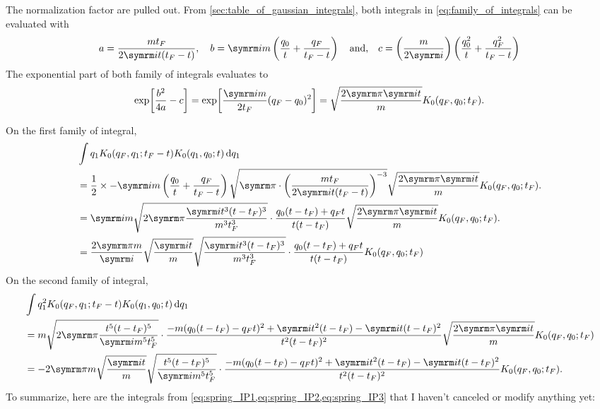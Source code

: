 The normalization factor are pulled out. From \cref{sec:table_of_gaussian_integrals}, both integrals in \cref{eq:family_of_integrals} can be evaluated with
\begin{equation}
    a = \frac{m t_F}{2\im t(t_F - t)}, \quad b = \im m\left(\frac{q_0}{t} + \frac{q_F}{t_F - t}\right) \mathand c = \left(\frac{m}{2\im}\right)\left(\frac{q_0^2}{t} + \frac{q_F^2}{t_F - t}\right)
\end{equation}
The exponential part of both family of integrals evaluates to
\begin{equation}
    \exp[\frac{b^2}{4a} - c] = \exp[\frac{\im m}{2t_F}(q_F - q_0)^2] = \sqrt{\frac{2\cpi\im t}{m}}K_0(q_F, q_0; t_F).
\end{equation}

On the first family of integral,
\begin{align}
    &\int q_1K_0(q_F, q_1; t_F - t)K_0(q_1, q_0; t)\dd{q_1} \\
    &= \frac{1}{2} \times -\im m\left(\frac{q_0}{t} + \frac{q_F}{t_F - t}\right)\sqrt{\cpi \cdot \left(\frac{m t_F}{2\im t(t_F - t)}\right)^{-3}}\sqrt{\frac{2\cpi\im t}{m}}K_0(q_F, q_0; t_F). \\
    &= \im m \sqrt{2\cpi\frac{\im t^3 (t - t_F)^3}{m^3t_F^3}}\cdot\frac{q_0(t - t_F) + q_Ft}{t(t - t_F)}\sqrt{\frac{2\cpi\im t}{m}}K_0(q_F, q_0; t_F). \\
    &= \frac{2\cpi m}{\im}\sqrt{\frac{\im t}{m}}\sqrt{\frac{\im t^3 (t - t_F)^3}{m^3t_F^3}}\cdot\frac{q_0(t - t_F) + q_Ft}{t(t - t_F)}K_0(q_F, q_0; t_F)
\end{align}
On the second family of integral,
\begin{align}
    &\int q_1^2K_0(q_F, q_1; t_F - t)K_0(q_1, q_0; t)\dd{q_1} \\
    &= m\sqrt{2\cpi\frac{t^5(t - t_F)^5}{\im m^5 t_F^5}}\cdot\frac{-m(q_0(t - t_F) - q_Ft)^2 + \im t^2(t - t_F) - \im t(t - t_F)^2}{t^2(t - t_F)^2}\sqrt{\frac{2\cpi\im t}{m}}K_0(q_F, q_0; t_F) \nonumber \\
    &= -2\cpi m \sqrt{\frac{\im t}{m}}\sqrt{\frac{t^5(t - t_F)^5}{\im m^5 t_F^5}}\cdot\frac{-m(q_0(t - t_F) - q_Ft)^2 + \im t^2(t - t_F) - \im t(t - t_F)^2}{t^2(t - t_F)^2}K_0(q_F, q_0; t_F).
\end{align}
To summarize, here are the integrals from \cref{eq:spring_IP1,eq:spring_IP2,eq:spring_IP3} that I haven't canceled or modify anything yet:
